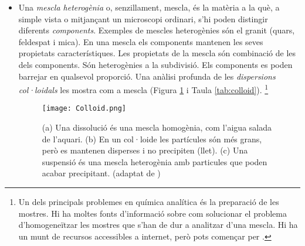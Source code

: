 \begin{itemize}
\item Una \emph{mescla heterogènia} o, senzillament, mescla, és la matèria a la què, a simple vista o mitjançant un microscopi ordinari, s'hi poden distingir diferents \emph{components}. Exemples de mescles heterogènies són el granit (quars, feldespat i mica). En una mescla els components mantenen les seves propietats característiques. Les propietats de la mescla són combinació de les dels components. Són heterogènies a la subdivisió. Els components es poden barrejar en qualsevol proporció. Una anàlisi profunda de les \emph{dispersions col·loidals} les mostra com a mescla (Figura \ref{fig:Colloid} i Taula \ref{tab:colloid}). \footnote{Un dels principals problemes en química analítica és la preparació de les mostres. Hi ha moltes fonts d'informació sobre com solucionar el problema d'homogeneïtzar les mostres que s'han de dur a analitzar d'una mescla. Hi ha un munt de recursos accessibles a internet, però pots començar per .}
\begin{figure}[h]
\centering
\texttt{[image: Colloid.png]}
\caption[Dissolucions, suspensions i col·loides]{(a) Una dissolució és una mescla homogènia, com l'aigua salada de l'aquari. (b) En un col·loide les partícules són més grans, però es mantenen disperses i no precipiten (llet). (c) Una suspensió és una mescla heterogènia amb particules que poden acabar precipitant. (adaptat de \cite{fernandez-nieves_fluids_2016})}
\label{fig:Colloid}
\end{figure}


\end{itemize}
